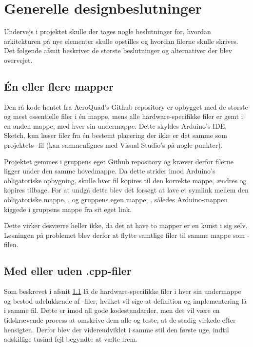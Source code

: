 \documentclass[Main]{subfiles}
\begin{document}
\section{Generelle designbeslutninger}
Undervejs i projektet skulle der tages nogle beslutninger for, hvordan arkitekturen på nye elementer skulle opstilles og hvordan filerne skulle skrives. 
Det følgende afsnit beskriver de største beslutninger og alternativer der blev overvejet.

\subsection{Én eller flere mapper}\label{Sec:en-flere}
Den rå kode hentet fra AeroQuad's Github repository \cite{Github-AQ} er opbygget med de største og mest essentielle filer i én mappe, mens alle hardware-specifikke filer er gemt i en anden mappe, med hver sin undermappe.
Dette skyldes Arduino's IDE, Sketch, kun læser filer fra én bestemt placering der ikke er det samme som projektets -fil (kan sammenlignes med Visual Studio's  på nogle punkter).

Projektet gemmes i gruppens eget Github repository \cite{Github-IHA} og kræver derfor filerne ligger under den samme hovedmappe.
Da dette strider imod Arduino's obligatoriske opbygning, skulle hver fil kopires til den korrekte mappe, ændres og kopires tilbage.
For at undgå dette blev det forsøgt at lave et symlink\cite{symlink} mellem den obligatoriske mappe, , og gruppens egen mappe, , således Arduino-mappen kiggede i gruppens mappe fra sit eget link.

Dette virker desværre heller ikke, da det at have to mapper er en kunst i sig selv.
Løsningen på problemet blev derfor at flytte samtlige filer til samme mappe som -filen.



\subsection{Med eller uden .cpp-filer}\label{Sec:cpp-filer}
Som beskrevet i afsnit \ref{Sec:en-flere} lå de hardware-specifikke filer i hver sin undermappe og bestod udelukkende af -filer, hvilket vil sige at definition og implementering lå i samme fil.
Dette er imod all gode kodestandarder, men det vil være en tidskrævende process at omskrive dem alle og teste, at de stadig virkede efter hensigten.
Derfor blev der videreudviklet i samme stil den første uge, indtil adskillige tusind fejl begyndte at vælte frem.
\end{document}
